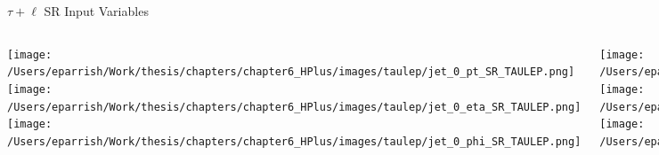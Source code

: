 \documentclass[aspectratio=169,xcolor=table]{beamer}
\begin{document}
    \begin{frame}[t]{$\tau+\ell$ SR Input Variables}
      \begin{columns}[t]
          \texttt{[image: /Users/eparrish/Work/thesis/chapters/chapter6\_HPlus/images/taulep/jet\_0\_pt\_SR\_TAULEP.png]}
          \texttt{[image: /Users/eparrish/Work/thesis/chapters/chapter6\_HPlus/images/taulep/jet\_0\_eta\_SR\_TAULEP.png]}
          \texttt{[image: /Users/eparrish/Work/thesis/chapters/chapter6\_HPlus/images/taulep/jet\_0\_phi\_SR\_TAULEP.png]}

          \texttt{[image: /Users/eparrish/Work/thesis/chapters/chapter6\_HPlus/images/taulep/lep\_0\_pt\_SR\_TAULEP.png]}
          \texttt{[image: /Users/eparrish/Work/thesis/chapters/chapter6\_HPlus/images/taulep/lep\_0\_eta\_SR\_TAULEP.png]}
          \texttt{[image: /Users/eparrish/Work/thesis/chapters/chapter6\_HPlus/images/taulep/lep\_0\_phi\_SR\_TAULEP.png]}

          \texttt{[image: /Users/eparrish/Work/thesis/chapters/chapter6\_HPlus/images/taulep/el\_0\_pt\_SR\_TAULEP.png]}
          \texttt{[image: /Users/eparrish/Work/thesis/chapters/chapter6\_HPlus/images/taulep/el\_0\_eta\_SR\_TAULEP.png]}
          \texttt{[image: /Users/eparrish/Work/thesis/chapters/chapter6\_HPlus/images/taulep/el\_0\_phi\_SR\_TAULEP.png]}

          \texttt{[image: /Users/eparrish/Work/thesis/chapters/chapter6\_HPlus/images/taulep/mu\_0\_pt\_SR\_TAULEP.png]}
          \texttt{[image: /Users/eparrish/Work/thesis/chapters/chapter6\_HPlus/images/taulep/mu\_0\_eta\_SR\_TAULEP.png]}
          \texttt{[image: /Users/eparrish/Work/thesis/chapters/chapter6\_HPlus/images/taulep/mu\_0\_phi\_SR\_TAULEP.png]}

      \end{columns}
    \end{frame}
\end{document}
